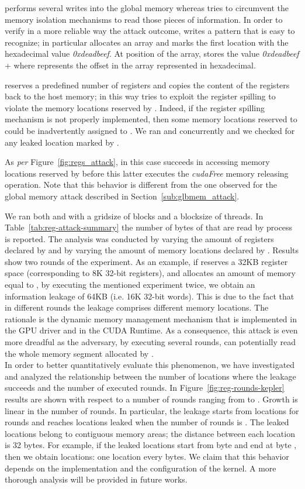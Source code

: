 \documentclass[11pt,onecolumn,letterpaper]{IEEEtran}
\begin{document}
 performs several writes into the global memory whereas  tries to circumvent the memory isolation mechanisms to read those pieces of  information. 
In order to verify in a more reliable way the attack outcome,  writes a pattern that is easy to recognize;
in particular  allocates an array and marks the first location with the hexadecimal value \emph{0xdeadbeef}.
At position  of the array,  stores the value \emph{0xdeadbeef} +  where  represents 
the offset in the array represented in hexadecimal.

 reserves a predefined number of registers and copies the content of the registers back to the host memory;
in this way  tries to exploit the register spilling to violate the memory locations reserved by . 
Indeed, if the register spilling mechanism is not properly implemented, 
then some memory locations reserved to  could be inadvertently assigned to . 
We ran  and  concurrently and we checked for any leaked location marked by .

As {\em per} Figure~\ref{fig:regs_attack}, in this case  succeeds in accessing memory locations reserved by  
before this latter executes the \emph{cudaFree} memory releasing operation. 
Note that this behavior is different from the one observed for the global memory attack described in Section~\ref{sub:glbmem_attack}. 

We ran both  and  with a gridsize of  blocks and a blocksize of  threads.
In Table~\ref{tab:reg-attack-summary} the number of bytes of  that are read by process  is reported.
The analysis was conducted by varying the amount of registers declared by  and by varying the amount of memory locations declared by .
Results show two rounds of the experiment.
As an example, if  reserves a 32KB register space (corresponding to 8K 32-bit registers), and  allocates an amount of memory equal to ,
by executing the mentioned experiment twice, we obtain an information leakage of 64KB (i.e. 16K 32-bit words).
This is due to the fact that in different rounds the leakage comprises different memory locations.
The rationale is the dynamic memory management mechanism that is implemented in the GPU driver and in the CUDA Runtime.
As a consequence, this attack is even more dreadful as the adversary, 
by executing several rounds, can potentially read the whole memory segment allocated by . \\

In order to better quantitatively evaluate this phenomenon, 
we have investigated and analyzed the relationship between the number of locations where the leakage succeeds and the number of executed rounds.
In Figure~\ref{fig:reg-rounds-kepler} results are shown with respect to a number of rounds ranging from  to .
Growth is linear in the number of rounds.
In particular, the leakage starts from  locations for  rounds  and reaches  locations leaked when the number of rounds is .
The leaked locations belong to contiguous memory areas; the distance between each location is 32 bytes.
For example, if the leaked locations start from byte  and end at byte , then we obtain  locations: one location every  bytes.
We claim that this behavior depends on the implementation and the configuration of the kernel.
A more thorough analysis will be provided in future works.
\end{document}
